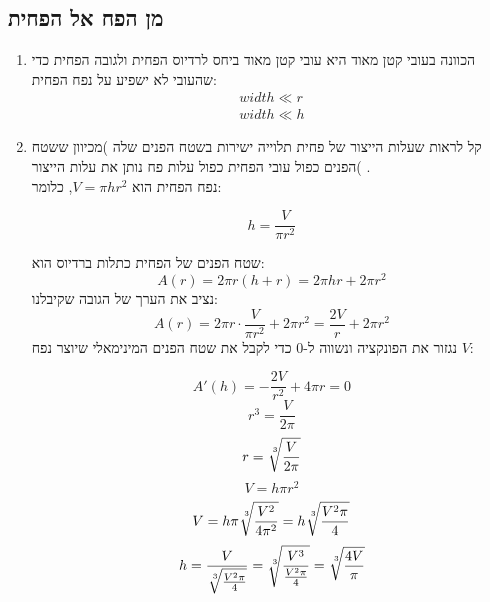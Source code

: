 \documentclass{article}
\begin{document}
\subsection*{מן הפח אל הפחית}
\begin{enumerate}
  \item הכוונה בעובי קטן מאוד היא עובי קטן מאוד ביחס לרדיוס הפחית ולגובה הפחית כדי שהעובי לא ישפיע על נפח הפחית:
  \begin{align*}
      width \ll r \\
      width \ll h
  \end{align*}
    



  \item קל לראות שעלות הייצור של פחית תלוייה ישירות בשטח הפנים שלה )מכיוון ששטח הפנים כפול עובי הפחית כפול עלות פח נותן את עלות הייצור( .\\
  נפח הפחית הוא $V = \pi h r^2$,
  כלומר:

  \begin{equation*}
      h = \frac{V}{\pi r^2}
  \end{equation*}

  שטח הפנים של הפחית כתלות ברדיוס הוא: 
  \begin{equation*}
      A(r) =  2\pi r\left( h+r \right) = 2\pi hr + 2\pi r^2
  \end{equation*}
  נציב את הערך של הגובה שקיבלנו:
    \begin{equation*}
      A(r) =  2\pi r \cdot \frac{V}{\pi r^2} + 2\pi r^2 = \frac{2V}{r} +2\pi r^2
    \end{equation*}
  נגזור את הפונקציה ונשווה ל-0 כדי לקבל את שטח הפנים המינימאלי שיוצר נפח $V$:

  \begin{equation*}
    A'(h) = -\frac{2V}{r^2} + 4\pi r = 0
  \end{equation*}
  \begin{equation*}
      r^3 = \frac{V}{2\pi}
  \end{equation*}
  \begin{equation*}
      r = \sqrt[\leftroot{-2}\uproot{2}3]{\frac{V}{2\pi}}
  \end{equation*}
    \begin{equation*}
      V = h\pi r^2
  \end{equation*}
  \begin{equation*}
      V = h\pi\sqrt[\leftroot{-2}\uproot{2}3]{\frac{V^2}{4\pi^2}} = h\sqrt[\leftroot{-2}\uproot{2}3]{\frac{V^2\pi}{4}}
  \end{equation*}
    \begin{equation*}
        h = \frac{V}{\sqrt[\leftroot{-2}\uproot{2}3]{\frac{V^2\pi}{4}}}
        = \sqrt[\leftroot{-2}\uproot{2}3]{\frac{V^3}{\frac{V^2\pi}{4}}}
        = \sqrt[\leftroot{-2}\uproot{2}3]{\frac{4V}{\pi}}
    \end{equation*}


\end{enumerate}
\end{document}
